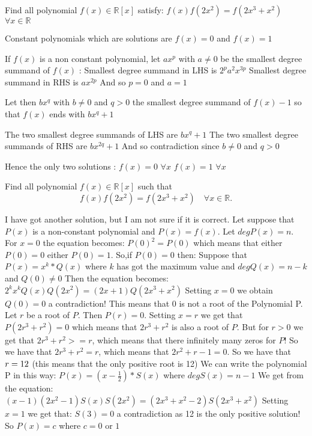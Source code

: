 \begin{solution}
	\begin{tcolorbox}Find all polynomial $f(x) \in \mathbb{R}[x] $ satisfy: $f(x)f(2x^2)=f(2x^3+x^2)$ $\forall x\in \mathbb{R}$\end{tcolorbox}
Constant polynomials which are solutions are $f(x)=0$ and $f(x)=1$

If $f(x)$ is a non constant polynomial, let $ax^p$ with $a\ne 0$ be the smallest degree summand of $f(x)$ :
Smallest degree summand in LHS is $2^pa^2x^{3p}$
Smallest degree summand in RHS is $ax^{2p}$
And so $p=0$ and $a=1$

Let then $bx^q$ with $b\ne 0$ and $q>0$ the smallest degree summand of $f(x)-1$ so that $f(x)$ ends with $bx^q+1$

The two smallest degree summands of LHS are $bx^q+1$
The two smallest degree summands of RHS are $bx^{2q}+1$
And so contradiction since $b\ne 0$ and $q>0$

Hence the only two solutions :
$f(x)=0$ $\forall x$
$f(x)=1$ $\forall x$
\end{solution}



\begin{solution}
	\begin{tcolorbox}Find all polynomial $f(x) \in \mathbb{R}[x] $ such that 
\[f(x)f(2x^2)=f(2x^3+x^2) \quad \forall  x\in \mathbb{R}.\]\end{tcolorbox}
I have got another solution, but I am not sure if it is correct.
Let suppose that $P(x)$ is a non-constant polynomial and $P(x)=f(x)$.
Let $degP(x)=n$.
For $x=0$ the equation becomes:
$P(0)^2=P(0)$
which means that either $P(0)=0$ either $P(0)=1$.
So,if $P(0)=0$ then:
Suppose that $P(x)=x^k*Q(x)$ where $k$ has got the maximum value and $degQ(x)=n-k$ and $Q(0)\neq0$
Then the equation becomes:
$2^kx^kQ(x)Q(2x^2)=(2x+1)Q(2x^3+x^2)$
Setting $x=0$ we obtain $Q(0)=0$ a contradiction!
This means that 0 is not a root of the Polynomial P.
Let $r$ be a root of $P$. Then $P(r)=0$.
Setting $x=r$ we get that $P(2r^3+r^2)=0$ which means that $2r^3+r^2$ is also a root of $P$.
But for $r>0$ we get that $2r^3+r^2>=r$, which means that there infinitely many zeros for $P$!
So we have that $2r^3+r^2=r$, which means that $2r^2+r-1=0$. So we have that $r=1\/2$ (this means that the only positive root is 1\/2)
We can write the polynomial P in this way:
$P(x)=(x-\frac{1}{2})*S(x)$ where $degS(x)=n-1$
We get from the equation:
$(x-1)(2x^2-1)S(x)S(2x^2)=(2x^3+x^2-2)S(2x^3+x^2)$
Setting $x=1$ we get that:
$S(3)=0$
a contradiction as 1\/2 is the only positive solution!
So $P(x)=c$ where $c=0$ or $1$
\end{solution}



